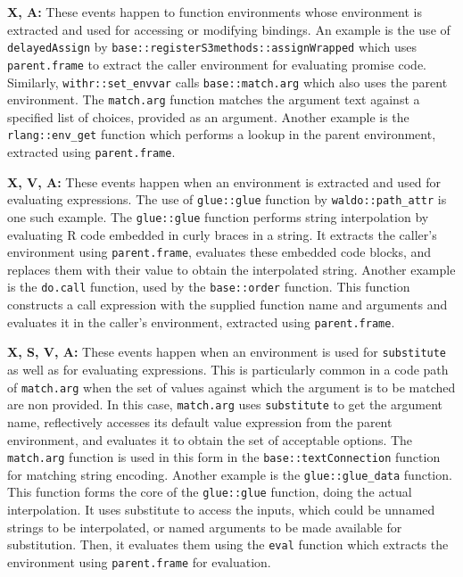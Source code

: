 \documentclass[10pt,review,sigplan,anonymous=true,authorversion=true,nonacm=true]{acmart}
\newcommand{\code}[1]{\lstinline |#1|\xspace}
\newcommand{\substitute}{\code{substitute}}
\begin{document}
\noindent
\textbf{X, A:} These events happen to function environments whose
  environment is extracted and used for accessing or modifying bindings. An
  example is the use of \code{delayedAssign} by
  \code{base::registerS3methods::assignWrapped} which uses \code{parent.frame}
  to extract the caller environment for evaluating promise code. Similarly,
  \code{withr::set_envvar} calls \code{base::match.arg} which also uses the
  parent environment. The \code{match.arg} function matches the argument text
  against a specified list of choices, provided as an argument. Another example
  is the \code{rlang::env_get} function which performs a lookup in the parent
  environment, extracted using \code{parent.frame}.

\noindent
\textbf{X, V, A:} These events happen when an environment is extracted
  and used for evaluating expressions. The use of \code{glue::glue} function by
  \code{waldo::path_attr} is one such example. The \code{glue::glue} function
  performs string interpolation by evaluating R code embedded in curly braces in
  a string. It extracts the caller's environment using \code{parent.frame},
  evaluates these embedded code blocks, and replaces them with their value to
  obtain the interpolated string. Another example is the \code{do.call}
  function, used by the \code{base::order} function. This function constructs a
  call expression with the supplied function name and arguments and evaluates it
  in the caller's environment, extracted using \code{parent.frame}.

\noindent
\textbf{X, S, V, A:} These events happen when an environment is used for
  \substitute as well as for evaluating expressions. This is particularly common
  in a code path of \code{match.arg} when the set of values against which the
  argument is to be matched are non provided. In this case, \code{match.arg}
  uses \code{substitute} to get the argument name, reflectively accesses its
  default value expression from the parent environment, and evaluates it to
  obtain the set of acceptable options. The \code{match.arg} function is used in
  this form in the \code{base::textConnection} function for matching string
  encoding. Another example is the \code{glue::glue_data} function. This
  function forms the core of the \code{glue::glue} function, doing the actual
  interpolation. It uses substitute to access the inputs, which could be unnamed
  strings to be interpolated, or named arguments to be made available for
  substitution. Then, it evaluates them using the \code{eval} function which
  extracts the environment using \code{parent.frame} for evaluation.
\end{document}
